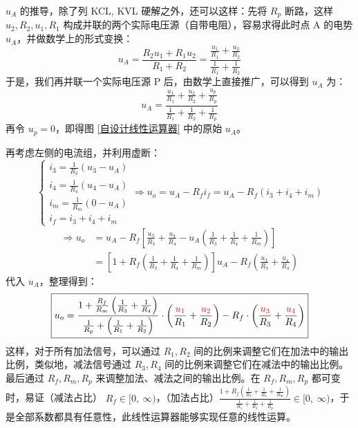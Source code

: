 \documentclass[a4paper]{article}  %
\theoremstyle{MyLineTheoremStyle} %
\theoremstyle{MyBlockTheoremStyle} %
\theoremstyle{MySubsubsectionStyle} %
\renewcommand{\small}{\fontsize{5pt}{3.5pt}\selectfont}
\begin{document}
\begin{multicols*}{4}
{\par\color{gray}\small
$u_A$ 的推导，除了列 KCL, KVL 硬解之外，还可以这样：先将 $R_p$ 断路，这样 $u_2, R_2, u_1, R_1$ 构成并联的两个实际电压源（自带电阻），容易求得此时点 A 的电势 $u_A$，并做数学上的形式变换：
\begin{equation}
u_A = \frac{R_2u_1 + R_1u_2}{R_1+R_2} =\frac{\frac{u_1}{R_1} + \frac{u_2}{R_2}}{\frac{1}{R_1} + \frac{1}{R_2} }
\end{equation}
于是，我们再并联一个实际电压源 P 后，由数学上直接推广，可以得到 $u_A$ 为：
\begin{equation}
    u_A = \frac{\frac{u_1}{R_1} + \frac{u_2}{R_2} + \frac{u_p}{R_p}}{\frac{1}{R_1} + \frac{1}{R_2} + \frac{1}{R_p}}
\end{equation}
再令 $u_p = 0$，即得图 \ref{自设计线性运算器} 中的原始 $u_A$。
\par}

再考虑左侧的电流组，并利用虚断：
\begin{equation}
    \begin{cases}
        i_3 = \frac{1}{R_3}(u_3 - u_A) \\ 
        i_4 = \frac{1}{R_4}(u_4 - u_A) \\ 
        i_m = \frac{1}{R_m}(0 - u_A) \\ 
        i_f = i_3 + i_4 + i_m
    \end{cases}
    \Longrightarrow 
    u_o = u_A - R_fi_f = u_A - R_f\left( i_3 + i_4 + i_m \right)
\end{equation}
\begin{align}
\Longrightarrow
u_o &=u_A - R_f \left[ 
\frac{u_3}{R_3} + \frac{u_4}{R_4} - u_A\left( \frac{1}{R_3} + \frac{1}{R_4} + \frac{1}{R_m} \right)
\right] \\ 
&=
\left[1 + R_f \left(\frac{1}{R_3} + \frac{1}{R_4} + \frac{1}{R_m} \right)\right] u_A - R_f \left( \frac{u_3}{R_3} + \frac{u_4}{R_4} \right) 
\end{align}
代入 $u_A$，整理得到：
\begin{equation}
\boxed{
    u_o= \frac{1 + \frac{R_f}{R_m} \left(\frac{1}{R_3} + \frac{1}{R_4}  \right)}{ \frac{1}{R_p} + \left(\frac{1}{R_1} + \frac{1}{R_2} \right)}\cdot \left( \frac{{\color{red} u_1}}{R_1} + \frac{{\color{red} u_2}}{R_2} \right) - R_f \cdot \left( \frac{{\color{red} u_3}}{R_3} + \frac{{\color{red} u_4}}{R_4} \right)
}
\end{equation}
这样，对于所有加法信号，可以通过 $R_1, R_2$ 间的比例来调整它们在加法中的输出比例，类似地，减法信号通过 $R_3, R_4$ 间的比例来调整它们在减法中的输出比例。最后通过 $R_f, R_m, R_p$ 来调整加法、减法之间的输出比例。在 $R_f, R_m, R_p$ 都可变时，易证（减法占比） $R_f \in [0,\ \infty)$，（加法占比）$\frac{1 + R_f \left(\frac{1}{R_3} + \frac{1}{R_4} + \frac{1}{R_m} \right)}{\frac{1}{R_1} + \frac{1}{R_2} + \frac{1}{R_p}} \in [0,\ \infty)$，于是全部系数都具有任意性，此线性运算器能够实现任意的线性运算。


\end{multicols*}
\end{document}
